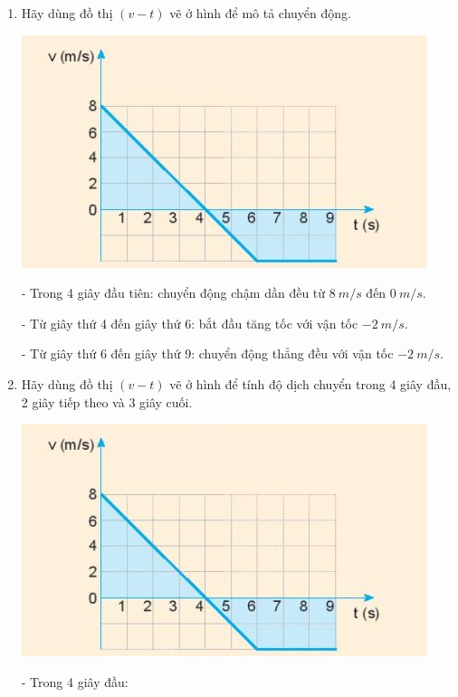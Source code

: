 \begin{enumerate}[label=\bfseries Câu \arabic*:]
	\item {}

	
	{Hãy dùng đồ thị $(v-t)$ vẽ ở hình để mô tả chuyển động.
		\begin{center}
			\includegraphics[scale=1]{../figs/VN10-2022-PH-TP012-4.jpg}
		\end{center}
	}

	\hideall
	{	
		- Trong 4 giây đầu tiên: chuyển động chậm dần đều từ  $\SI{8}{m/s}$ đến  $\SI{0}{m/s}$.
		
		- Từ giây thứ 4 đến giây thứ 6: bắt đầu tăng tốc với vận tốc  $- \SI{2}{m/s}$.
		
		- Từ giây thứ 6 đến giây thứ 9: chuyển động thẳng đều với vận tốc $- \SI{2}{m/s}$.
		
	}
	\item {}

	
	{Hãy dùng đồ thị $(v-t)$ vẽ ở hình để tính độ dịch chuyển trong 4 giây đầu, 2 giây tiếp theo và 3 giây cuối.
		\begin{center}
			\includegraphics[scale=1]{../figs/VN10-2022-PH-TP012-4.jpg}
		\end{center}
	}

	\hideall
	{
		- Trong 4 giây đầu:
		
}
\end{enumerate}
